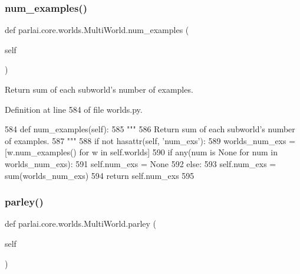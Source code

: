 \subsubsection{\texorpdfstring{num\+\_\+examples()}{num\_examples()}}
{\footnotesize\ttfamily def parlai.\+core.\+worlds.\+Multi\+World.\+num\+\_\+examples (\begin{DoxyParamCaption}\item[{}]{self }\end{DoxyParamCaption})}

\begin{DoxyVerb}Return sum of each subworld's number of examples.
\end{DoxyVerb}
 

Definition at line 584 of file worlds.\+py.


\begin{DoxyCode}
584     \textcolor{keyword}{def }num\_examples(self):
585         \textcolor{stringliteral}{"""}
586 \textcolor{stringliteral}{        Return sum of each subworld's number of examples.}
587 \textcolor{stringliteral}{        """}
588         \textcolor{keywordflow}{if} \textcolor{keywordflow}{not} hasattr(self, \textcolor{stringliteral}{'num\_exs'}):
589             worlds\_num\_exs = [w.num\_examples() \textcolor{keywordflow}{for} w \textcolor{keywordflow}{in} self.worlds]
590             \textcolor{keywordflow}{if} any(num \textcolor{keywordflow}{is} \textcolor{keywordtype}{None} \textcolor{keywordflow}{for} num \textcolor{keywordflow}{in} worlds\_num\_exs):
591                 self.num\_exs = \textcolor{keywordtype}{None}
592             \textcolor{keywordflow}{else}:
593                 self.num\_exs = sum(worlds\_num\_exs)
594         \textcolor{keywordflow}{return} self.num\_exs
595 
\end{DoxyCode}
\mbox{\label{classparlai_1_1core_1_1worlds_1_1MultiWorld_aae71b8182e17a1579352a52b56614b64}} 
\subsubsection{\texorpdfstring{parley()}{parley()}}
{\footnotesize\ttfamily def parlai.\+core.\+worlds.\+Multi\+World.\+parley (\begin{DoxyParamCaption}\item[{}]{self }\end{DoxyParamCaption})}

